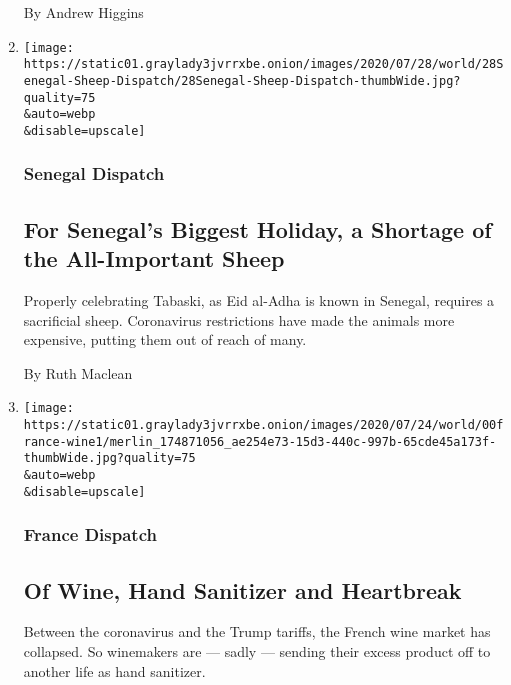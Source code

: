 \begin{enumerate}
  By Andrew Higgins
\item
  \href{/2020/07/29/world/africa/senegal-tabaski-sheep-eid-adha.html}{}

  \texttt{[image: https://static01.graylady3jvrrxbe.onion/images/2020/07/28/world/28Senegal-Sheep-Dispatch/28Senegal-Sheep-Dispatch-thumbWide.jpg?quality=75\\\&auto=webp\\\&disable=upscale]}

  \hypertarget{senegal-dispatch}{%
  \subsubsection{Senegal Dispatch}\label{senegal-dispatch}}

  \hypertarget{for-senegals-biggest-holiday-a-shortage-of-the-all-important-sheep}{%
  \subsection{For Senegal's Biggest Holiday, a Shortage of the
  All-Important
  Sheep}\label{for-senegals-biggest-holiday-a-shortage-of-the-all-important-sheep}}

  Properly celebrating Tabaski, as Eid al-Adha is known in Senegal,
  requires a sacrificial sheep. Coronavirus restrictions have made the
  animals more expensive, putting them out of reach of many.

  By Ruth Maclean
\item
  \href{/2020/07/27/world/europe/france-alsace-wine-coronavirus.html}{}

  \texttt{[image: https://static01.graylady3jvrrxbe.onion/images/2020/07/24/world/00france-wine1/merlin\_174871056\_ae254e73-15d3-440c-997b-65cde45a173f-thumbWide.jpg?quality=75\\\&auto=webp\\\&disable=upscale]}

  \hypertarget{france-dispatch}{%
  \subsubsection{France Dispatch}\label{france-dispatch}}

  \hypertarget{of-wine-hand-sanitizer-and-heartbreak}{%
  \subsection{Of Wine, Hand Sanitizer and
  Heartbreak}\label{of-wine-hand-sanitizer-and-heartbreak}}

  Between the coronavirus and the Trump tariffs, the French wine market
  has collapsed. So winemakers are --- sadly --- sending their excess
  product off to another life as hand sanitizer.


\end{enumerate}
